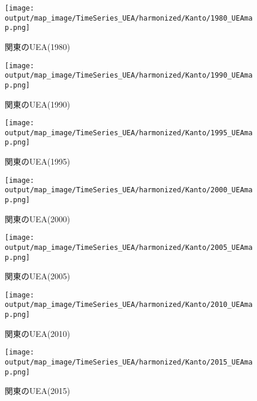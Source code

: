 \documentclass{ltjsarticle}
\begin{document}
\begin{figure}[pbth]
  \centering
  \texttt{[image: output/map\_image/TimeSeries\_UEA/harmonized/Kanto/1980\_UEAmap.png]}
  \caption{\label{ham:1980UEA:kan}関東のUEA(1980)}
\end{figure}
\begin{figure}[pbth]
  \centering
  \texttt{[image: output/map\_image/TimeSeries\_UEA/harmonized/Kanto/1990\_UEAmap.png]}
  \caption{\label{ham:1990UEA:kan}関東のUEA(1990)}
\end{figure}
\begin{figure}[pbth]
  \centering
  \texttt{[image: output/map\_image/TimeSeries\_UEA/harmonized/Kanto/1995\_UEAmap.png]}
  \caption{\label{ham:1995UEA:kan}関東のUEA(1995)}
\end{figure}
\begin{figure}[pbth]
  \centering
  \texttt{[image: output/map\_image/TimeSeries\_UEA/harmonized/Kanto/2000\_UEAmap.png]}
  \caption{\label{ham:2000UEA:kan}関東のUEA(2000)}
\end{figure}
\begin{figure}[pbth]
  \centering
  \texttt{[image: output/map\_image/TimeSeries\_UEA/harmonized/Kanto/2005\_UEAmap.png]}
  \caption{\label{ham:2005UEA:kan}関東のUEA(2005)}
\end{figure}
\begin{figure}[pbth]
  \centering
  \texttt{[image: output/map\_image/TimeSeries\_UEA/harmonized/Kanto/2010\_UEAmap.png]}
  \caption{\label{ham:2010UEA:kan}関東のUEA(2010)}
\end{figure}
\begin{figure}[pbth]
  \centering
  \texttt{[image: output/map\_image/TimeSeries\_UEA/harmonized/Kanto/2015\_UEAmap.png]}
  \caption{\label{ham:2015UEA:kan}関東のUEA(2015)}
\end{figure}



\clearpage
\end{document}
